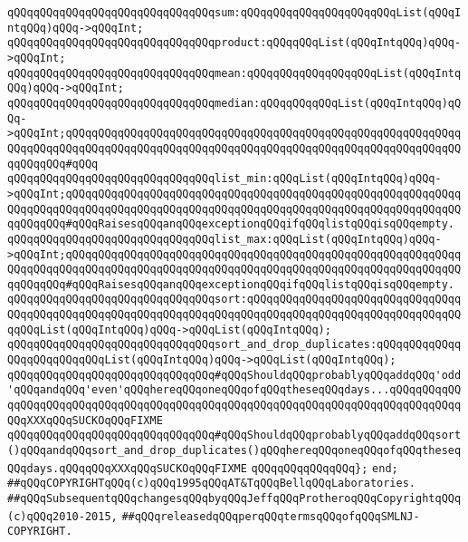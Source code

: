\newline
\verb|qQQqqQQqqQQqqQQqqQQqqQQqqQQqqQQqsum:qQQqqQQqqQQqqQQqqQQqqQQqList(qQQqIntqQQq)qQQq->qQQqInt;|\newline
\verb|qQQqqQQqqQQqqQQqqQQqqQQqqQQqqQQqproduct:qQQqqQQqList(qQQqIntqQQq)qQQq->qQQqInt;|\newline
\newline
\verb|qQQqqQQqqQQqqQQqqQQqqQQqqQQqqQQqmean:qQQqqQQqqQQqqQQqqQQqList(qQQqIntqQQq)qQQq->qQQqInt;|\newline
\verb|qQQqqQQqqQQqqQQqqQQqqQQqqQQqqQQqmedian:qQQqqQQqqQQqList(qQQqIntqQQq)qQQq->qQQqInt;qQQqqQQqqQQqqQQqqQQqqQQqqQQqqQQqqQQqqQQqqQQqqQQqqQQqqQQqqQQqqQQqqQQqqQQqqQQqqQQqqQQqqQQqqQQqqQQqqQQqqQQqqQQqqQQqqQQqqQQqqQQqqQQqqQQqqQQqqQQq#qQQq|\newline
\newline
\verb|qQQqqQQqqQQqqQQqqQQqqQQqqQQqqQQqlist_min:qQQqList(qQQqIntqQQq)qQQq->qQQqInt;qQQqqQQqqQQqqQQqqQQqqQQqqQQqqQQqqQQqqQQqqQQqqQQqqQQqqQQqqQQqqQQqqQQqqQQqqQQqqQQqqQQqqQQqqQQqqQQqqQQqqQQqqQQqqQQqqQQqqQQqqQQqqQQqqQQqqQQqqQQq#qQQqRaisesqQQqanqQQqexceptionqQQqifqQQqlistqQQqisqQQqempty.|\newline
\verb|qQQqqQQqqQQqqQQqqQQqqQQqqQQqqQQqlist_max:qQQqList(qQQqIntqQQq)qQQq->qQQqInt;qQQqqQQqqQQqqQQqqQQqqQQqqQQqqQQqqQQqqQQqqQQqqQQqqQQqqQQqqQQqqQQqqQQqqQQqqQQqqQQqqQQqqQQqqQQqqQQqqQQqqQQqqQQqqQQqqQQqqQQqqQQqqQQqqQQqqQQqqQQq#qQQqRaisesqQQqanqQQqexceptionqQQqifqQQqlistqQQqisqQQqempty.|\newline
\newline
\verb|qQQqqQQqqQQqqQQqqQQqqQQqqQQqqQQqsort:qQQqqQQqqQQqqQQqqQQqqQQqqQQqqQQqqQQqqQQqqQQqqQQqqQQqqQQqqQQqqQQqqQQqqQQqqQQqqQQqqQQqqQQqqQQqqQQqqQQqqQQqqQQqList(qQQqIntqQQq)qQQq->qQQqList(qQQqIntqQQq);|\newline
\verb|qQQqqQQqqQQqqQQqqQQqqQQqqQQqqQQqsort_and_drop_duplicates:qQQqqQQqqQQqqQQqqQQqqQQqqQQqList(qQQqIntqQQq)qQQq->qQQqList(qQQqIntqQQq);|\newline
\newline
\verb|qQQqqQQqqQQqqQQqqQQqqQQqqQQqqQQq#qQQqShouldqQQqprobablyqQQqaddqQQq'odd'qQQqandqQQq'even'qQQqhereqQQqoneqQQqofqQQqtheseqQQqdays...qQQqqQQqqQQqqQQqqQQqqQQqqQQqqQQqqQQqqQQqqQQqqQQqqQQqqQQqqQQqqQQqqQQqqQQqqQQqqQQqqQQqXXXqQQqSUCKOqQQqFIXME|\newline
\verb|qQQqqQQqqQQqqQQqqQQqqQQqqQQqqQQq#qQQqShouldqQQqprobablyqQQqaddqQQqsort()qQQqandqQQqsort_and_drop_duplicates()qQQqhereqQQqoneqQQqofqQQqtheseqQQqdays.qQQqqQQqXXXqQQqSUCKOqQQqFIXME|\newline
\verb|qQQqqQQqqQQqqQQq};|\newline
\verb|end;|\newline
\newline
\newline
\newline
\verb|##qQQqCOPYRIGHTqQQq(c)qQQq1995qQQqAT&TqQQqBellqQQqLaboratories.|\newline
\verb|##qQQqSubsequentqQQqchangesqQQqbyqQQqJeffqQQqProtheroqQQqCopyrightqQQq(c)qQQq2010-2015,|\newline
\verb|##qQQqreleasedqQQqperqQQqtermsqQQqofqQQqSMLNJ-COPYRIGHT.|\newline

